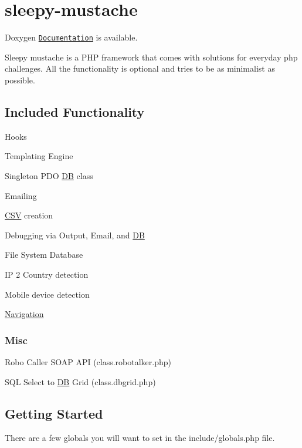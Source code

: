 \section*{sleepy-\/mustache}

Doxygen \href{documentation/html/index.html}{\tt Documentation} is available.

Sleepy mustache is a P\-H\-P framework that comes with solutions for everyday php challenges. All the functionality is optional and tries to be as minimalist as possible.

\subsection*{Included Functionality}


\begin{DoxyItemize}
\item Hooks
\item Templating Engine
\item Singleton P\-D\-O \hyperlink{class_d_b}{D\-B} class
\item Emailing
\item \hyperlink{class_c_s_v}{C\-S\-V} creation
\item Debugging via Output, Email, and \hyperlink{class_d_b}{D\-B}
\item File System Database
\item I\-P 2 Country detection
\item Mobile device detection
\item \hyperlink{class_navigation}{Navigation}
\end{DoxyItemize}

\subsubsection*{Misc}


\begin{DoxyItemize}
\item Robo Caller S\-O\-A\-P A\-P\-I (class.\-robotalker.\-php)
\item S\-Q\-L Select to \hyperlink{class_d_b}{D\-B} Grid (class.\-dbgrid.\-php)
\end{DoxyItemize}

\subsection*{Getting Started}

There are a few globals you will want to set in the include/globals.\-php file.


